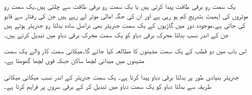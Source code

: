  یک سمت  رو برقی طاقت پیدا کرتی ہیں یا یک سمت  رو برقی طاقت سے چلتی ہیں۔یک سمت  رو موٹروں کی اہمیت بتدریج کم ہو رہی ہے اور ان کی جگہ امالی موٹر لے رہے ہیں جن کی رفتار   سے قابو کی جاتی ہے۔موجودہ دور میں گاڑیوں کے یک سمت  جنریٹر بھی دراصل سادہ بدلتا رو جنریٹر ہوتے ہیں جن کے اندر نسب   بدلتا محرک برقی دباو کو یک سمت  محرک برقی دباو میں تبدیل کرتے ہیں۔

اس باب میں دو قطب کے یک سمت  مشینوں کا مطالعہ کیا جائے گا۔میکانی سمت کار  والے یک سمت  مشینوں میں میدانی لچھا ساکن  جبکہ قوی لچھا گھومتا ہے۔

جنریٹر بنیادی طور پر بدلتا برقی دباو پیدا کرتا ہے۔ یک سمت  جنریٹر کے اندر نسب  میکانی  میکانی طریقہ سے بدلتا دباو کو یک سمت  دباو میں تبدیل کر کے برقی سروں پر فراہم کرتا ہے۔

